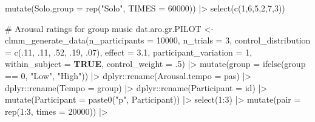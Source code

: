 \documentclass[
  bookmarksnumbered]{article}
\newenvironment{Shaded}{\begin{snugshade}}{\end{snugshade}}
\newcommand{\AttributeTok}[1]{\textcolor[rgb]{0.80,0.80,0.80}{#1}}
\newcommand{\CommentTok}[1]{\textcolor[rgb]{0.50,0.62,0.50}{#1}}
\newcommand{\ConstantTok}[1]{\textcolor[rgb]{0.86,0.64,0.64}{\textbf{#1}}}
\newcommand{\DecValTok}[1]{\textcolor[rgb]{0.86,0.86,0.80}{#1}}
\newcommand{\FloatTok}[1]{\textcolor[rgb]{0.75,0.75,0.82}{#1}}
\newcommand{\FunctionTok}[1]{\textcolor[rgb]{0.94,0.94,0.56}{#1}}
\newcommand{\NormalTok}[1]{\textcolor[rgb]{0.80,0.80,0.80}{#1}}
\newcommand{\OtherTok}[1]{\textcolor[rgb]{0.94,0.94,0.56}{#1}}
\newcommand{\SpecialCharTok}[1]{\textcolor[rgb]{0.86,0.64,0.64}{#1}}
\newcommand{\StringTok}[1]{\textcolor[rgb]{0.80,0.58,0.58}{#1}}
\begin{document}
\begin{Shaded}
\begin{Highlighting}[]
  \FunctionTok{mutate}\NormalTok{(}\AttributeTok{Solo.group =} \FunctionTok{rep}\NormalTok{(}\StringTok{"Solo"}\NormalTok{, }\AttributeTok{TIMES =} \DecValTok{60000}\NormalTok{)) }\SpecialCharTok{|\textgreater{}}
  \FunctionTok{select}\NormalTok{(}\FunctionTok{c}\NormalTok{(}\DecValTok{1}\NormalTok{,}\DecValTok{6}\NormalTok{,}\DecValTok{5}\NormalTok{,}\DecValTok{2}\NormalTok{,}\DecValTok{7}\NormalTok{,}\DecValTok{3}\NormalTok{))}

\CommentTok{\# Arousal ratings for group music}
\NormalTok{dat.aro.gr.PILOT }\OtherTok{\textless{}{-}} \FunctionTok{clmm\_generate\_data}\NormalTok{(}\AttributeTok{n\_participants =} \DecValTok{10000}\NormalTok{,}
                                 \AttributeTok{n\_trials =} \DecValTok{3}\NormalTok{,}
                                 \AttributeTok{control\_distribution =} \FunctionTok{c}\NormalTok{(.}\DecValTok{11}\NormalTok{, .}\DecValTok{11}\NormalTok{, .}\DecValTok{52}\NormalTok{, .}\DecValTok{19}\NormalTok{, .}\DecValTok{07}\NormalTok{),}
                                 \AttributeTok{effect =} \FloatTok{3.1}\NormalTok{,}
                                 \AttributeTok{participant\_variation =} \DecValTok{1}\NormalTok{,}
                                 \AttributeTok{within\_subject =} \ConstantTok{TRUE}\NormalTok{,}
                                 \AttributeTok{control\_weight =}\NormalTok{ .}\DecValTok{5}\NormalTok{) }\SpecialCharTok{|\textgreater{}}
  \FunctionTok{mutate}\NormalTok{(}\AttributeTok{group =} \FunctionTok{ifelse}\NormalTok{(group }\SpecialCharTok{==} \DecValTok{0}\NormalTok{, }\StringTok{"Low"}\NormalTok{, }\StringTok{"High"}\NormalTok{)) }\SpecialCharTok{|\textgreater{}}
\NormalTok{  dplyr}\SpecialCharTok{::}\FunctionTok{rename}\NormalTok{(}\AttributeTok{Arousal.tempo =}\NormalTok{ pas) }\SpecialCharTok{|\textgreater{}}
\NormalTok{  dplyr}\SpecialCharTok{::}\FunctionTok{rename}\NormalTok{(}\AttributeTok{Tempo =}\NormalTok{ group) }\SpecialCharTok{|\textgreater{}}
\NormalTok{  dplyr}\SpecialCharTok{::}\FunctionTok{rename}\NormalTok{(}\AttributeTok{Participant =}\NormalTok{ id) }\SpecialCharTok{|\textgreater{}}
  \FunctionTok{mutate}\NormalTok{(}\AttributeTok{Participant =} \FunctionTok{paste0}\NormalTok{(}\StringTok{"p"}\NormalTok{, Participant)) }\SpecialCharTok{|\textgreater{}}
  \FunctionTok{select}\NormalTok{(}\DecValTok{1}\SpecialCharTok{:}\DecValTok{3}\NormalTok{) }\SpecialCharTok{|\textgreater{}}
  \FunctionTok{mutate}\NormalTok{(}\AttributeTok{pair =} \FunctionTok{rep}\NormalTok{(}\DecValTok{1}\SpecialCharTok{:}\DecValTok{3}\NormalTok{, }\AttributeTok{times =} \DecValTok{20000}\NormalTok{)) }\SpecialCharTok{|\textgreater{}}

\end{Highlighting}
\end{Shaded}
\end{document}
